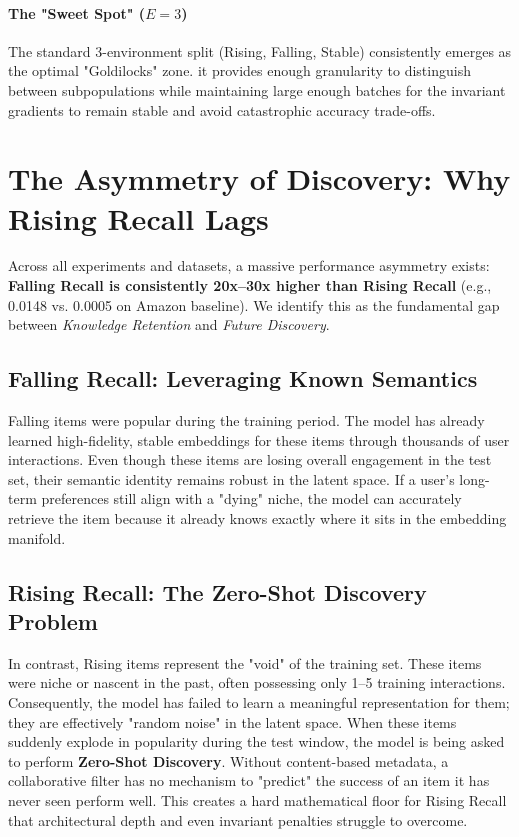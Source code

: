 \documentclass{article}
\begin{document}
\paragraph{The "Sweet Spot" ($E=3$)}
The standard 3-environment split (Rising, Falling, Stable) consistently emerges as the optimal "Goldilocks" zone. it provides enough granularity to distinguish between subpopulations while maintaining large enough batches for the invariant gradients to remain stable and avoid catastrophic accuracy trade-offs.

\section{The Asymmetry of Discovery: Why Rising Recall Lags}
Across all experiments and datasets, a massive performance asymmetry exists: \textbf{Falling Recall is consistently 20x--30x higher than Rising Recall} (e.g., 0.0148 vs. 0.0005 on Amazon baseline). We identify this as the fundamental gap between \textit{Knowledge Retention} and \textit{Future Discovery}.

\subsection{Falling Recall: Leveraging Known Semantics}
Falling items were popular during the training period. The model has already learned high-fidelity, stable embeddings for these items through thousands of user interactions. Even though these items are losing overall engagement in the test set, their semantic identity remains robust in the latent space. If a user's long-term preferences still align with a "dying" niche, the model can accurately retrieve the item because it already knows exactly where it sits in the embedding manifold.

\subsection{Rising Recall: The Zero-Shot Discovery Problem}
In contrast, Rising items represent the "void" of the training set. These items were niche or nascent in the past, often possessing only 1--5 training interactions. Consequently, the model has failed to learn a meaningful representation for them; they are effectively "random noise" in the latent space. When these items suddenly explode in popularity during the test window, the model is being asked to perform \textbf{Zero-Shot Discovery}. Without content-based metadata, a collaborative filter has no mechanism to "predict" the success of an item it has never seen perform well. This creates a hard mathematical floor for Rising Recall that architectural depth and even invariant penalties struggle to overcome.
\end{document}
